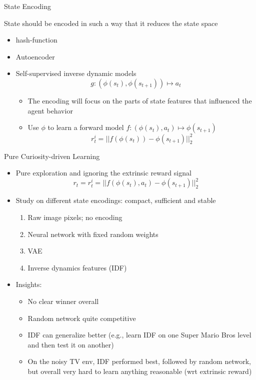 \documentclass[aspectratio=169]{../latex_main/tntbeamer}  %
\begin{document}
\begin{frame}[c]{State Encoding}
	

	State should be encoded in such a way that it reduces the state space
	\begin{itemize}
		\item hash-function~
		\item Autoencoder~
		\item Self-supervised inverse dynamic models~
		$$g: (\phi(s_t), \phi(s_{t+1})) \mapsto a_t $$
		\begin{itemize}
			\item The encoding will focus on the parts of state features that influenced the agent behavior
			\item Use $\phi$ to learn a forward model $f: (\phi(s_t), a_t) \mapsto \phi(s_{t+1})$
			$$ r_t^i = || f(\phi(s_{t})) - \phi(s_{t+1})||^2_2$$
		\end{itemize}
	\end{itemize}
	
	
\end{frame}
\begin{frame}[c]{Pure Curiosity-driven Learning~}
	
	\begin{itemize}
		\item Pure exploration and ignoring the extrinsic reward signal
		$$r_t  = r_t^i = ||f(\phi(s_t), a_t) - \phi(s_{t+1}) ||_2^2 $$
		\item Study on different state encodings: compact, sufficient and stable
		\begin{enumerate}
			\item Raw image pixels; no encoding
			\item Neural network with fixed random weights
			\item VAE
			\item Inverse dynamics features (IDF)
		\end{enumerate}
		\item Insights:
		\begin{itemize}
			\item No clear winner overall
			\item Random network quite competitive
			\item IDF can generalize better (e.g., learn IDF on one Super Mario Bros level and then test it on another)
			\item On the noisy TV env, IDF performed best, followed by random network, but overall very hard to learn anything reasonable (wrt extrinsic reward)
		\end{itemize}
	\end{itemize}
	
	
\end{frame}
\end{document}
